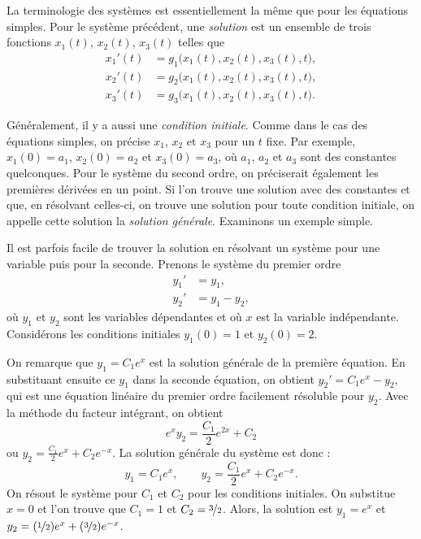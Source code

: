 La terminologie des systèmes est essentiellement la même que pour les équations simples. Pour le système précédent, une 
\emph{solution}
est un ensemble de trois fonctions $x_1(t)$, $x_2(t)$, $x_3(t)$ telles que
\begin{align*}
x_1'(t) &= g_1\bigl(x_1(t),x_2(t),x_3(t),t\bigr) , \\
x_2'(t) &= g_2\bigl(x_1(t),x_2(t),x_3(t),t\bigr) , \\
x_3'(t) &= g_3\bigl(x_1(t),x_2(t),x_3(t),t\bigr) .
\end{align*}

Généralement, il y a aussi une
\emph{condition initiale}. Comme dans le cas des équations simples, on précise $x_1$, $x_2$ et $x_3$ pour un $t$ fixe.
Par exemple, $x_1(0) = a_1$, $x_2(0) = a_2$ et $x_3(0) = a_3$, où $a_1$, $a_2$ et $a_3$ sont des constantes quelconques. Pour le système du second ordre, on préciserait également les premières dérivées en un point. Si l'on trouve une solution avec des constantes et que, en résolvant celles-ci, on trouve une solution pour toute condition initiale, on appelle cette solution la \emph{solution générale}.
Examinons un exemple simple.

\begin{example}
Il est parfois facile de trouver la solution en résolvant un système pour une variable puis pour la seconde. Prenons le système du premier ordre
\begin{align*}
y_1' & = y_1 , \\
y_2' & = y_1 - y_2 ,
\end{align*}
où $y_1$ et $y_2$ sont les variables dépendantes et où $x$ est la variable indépendante. Considérons les conditions initiales 
$y_1(0) = 1$ et $y_2(0) = 2$.

On remarque que $y_1 = C_1 e^x$ est la solution générale de la première équation. En substituant ensuite ce $y_1$ dans la seconde équation, on obtient $y_2' = C_1e^x - y_2$, qui est une équation linéaire du premier ordre facilement résoluble pour $y_2$. Avec la méthode du facteur intégrant, on obtient
\begin{equation*}
e^x y_2 = \frac{C_1}{2}e^{2x} + C_2
\end{equation*}
ou $y_2 = \frac{C_1}{2}e^{x} + C_2e^{-x}$. La solution générale du système est donc :
\begin{equation*}
y_1 = C_1 e^x , \qquad
y_2 = \frac{C_1}{2}e^{x} + C_2e^{-x} .
\end{equation*}
On résout le système pour $C_1$ et $C_2$ pour les conditions initiales. On substitue $x=0$ et l'on trouve que 
$C_1=1$ et $C_2=\nicefrac{3}{2}$. Alors, la solution est
$y_1 = e^x$ et
$y_2 = (\nicefrac{1}{2}) e^x + (\nicefrac{3}{2}) e^{-x}$.
\end{example}

